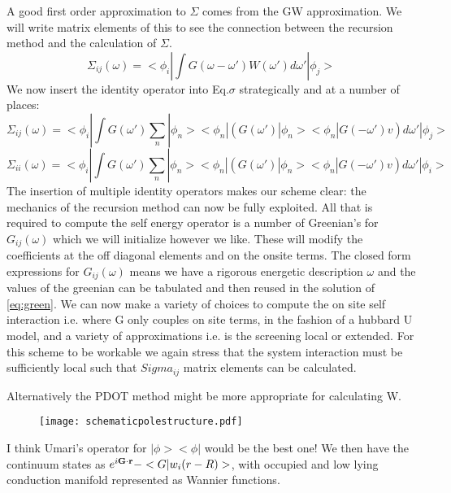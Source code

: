 \documentclass{article}
\def\G{{\bf G}}
\def\r{{\bf r}}
\begin{document}
A good first order approximation to $\Sigma$ comes from the GW approximation.
We will write matrix elements of this to see the connection between the
recursion method and the calculation of $\Sigma$. 
%
\begin{equation}
\label{eq:sigma}
\Sigma_{ij}(\omega) = <\phi_{i}|\int G(\omega-\omega')W(\omega')d\omega'|\phi_{j}>
\end{equation}
%
	We now insert the identity operator into Eq.$\sigma$ strategically and at 
a number of places:
%
\begin{equation}
\label{eq:sigma}
\Sigma_{ij}(\omega) = <\phi_{i}|\int G(\omega')\sum_{n}|\phi_{n}><\phi_{n}|(G(\omega')|\phi_{n}><\phi_{n}|G(-\omega')v)d\omega'|\phi_{j}>
\end{equation}
%
\begin{equation}
\label{eq:sigma_onsite}%
\Sigma_{ii}(\omega) = <\phi_{i}|\int G(\omega')\sum_{n}|\phi_{n}><\phi_{n}|(G(\omega')|\phi_{n}><\phi_{n}|G(-\omega')v)d\omega'|\phi_{i}>
\end{equation}
%
	The insertion of multiple identity operators
makes our scheme clear: the mechanics of the recursion method 
can now be fully exploited. All that is required to compute the self energy 
operator is a number of Greenian's for $G_{ij}(\omega)$ which we will
initialize however we like. These will modify the coefficients at the
off diagonal elements and on the onsite terms. The closed form
expressions for $G_{ij}(\omega)$ means we have a rigorous 
energetic description $\omega$ and the values of the greenian 
can be tabulated and then reused in the solution of \ref{eq:green}.
We can now make a variety of choices to compute the on site self interaction
i.e. where G only couples on site terms, in the fashion of a hubbard U model,
and a variety of approximations i.e. is the screening local or extended.
For this scheme to be workable we again stress that the system interaction
must be sufficiently local such that $Sigma_{ij}$ matrix elements can be
calculated.

Alternatively the PDOT method might be more appropriate for calculating W.

\begin{figure}
\texttt{[image: schematicpolestructure.pdf]}
\end{figure}

I think Umari's operator for $|\phi><\phi|$ would be the best one!
We then have the continuum states as $e^{i\G\cdot\r}-<G|w_{i}(r-R)>$,
with occupied and low lying conduction manifold represented as Wannier 
functions.
\end{document}
